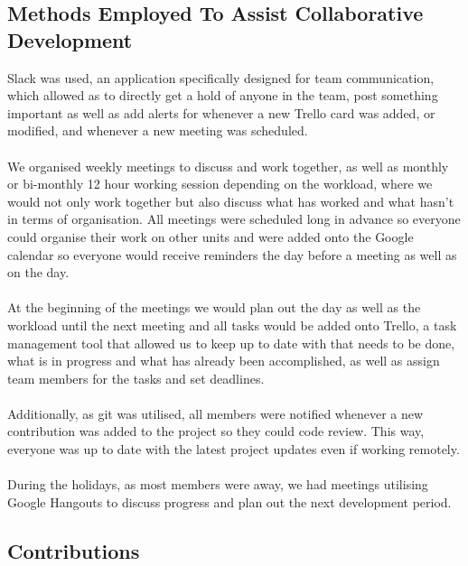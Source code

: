 \documentclass[11pt,a4paper]{article}
\begin{document}
        \subsection{Methods Employed To Assist Collaborative Development}
        Slack was used, an application specifically designed for team communication, which allowed as to directly get a hold of anyone in the team, post something important as well as add alerts for whenever a new Trello card was added, or modified, and whenever a new meeting was scheduled. \\ \\
        We organised weekly meetings to discuss and work together, as well as monthly or bi-monthly 12 hour working session depending on the workload, where we would not only work together but also discuss what has worked and what hasn’t in terms of organisation. All meetings were scheduled long in advance so everyone could organise their work on other units and were added onto the Google calendar so everyone would receive reminders the day before a meeting as well as on the day.\\\\
        At the beginning of the meetings we would plan out the day as well as the workload until the next meeting and all tasks would be added onto Trello, a task management tool that allowed us to keep up to date with that needs to be done, what is in progress and what has already been accomplished, as well as assign team members for the tasks and set deadlines.\\\\
        Additionally, as git was utilised, all members were notified whenever a new contribution was added to the project so they could code review. This way, everyone was up to date with the latest project updates even if working remotely. \\\\
        During the holidays, as most members were away, we had meetings utilising Google Hangouts to discuss progress and plan out the next development period. 

        \pagebreak

        \subsection{Contributions}
\end{document}
